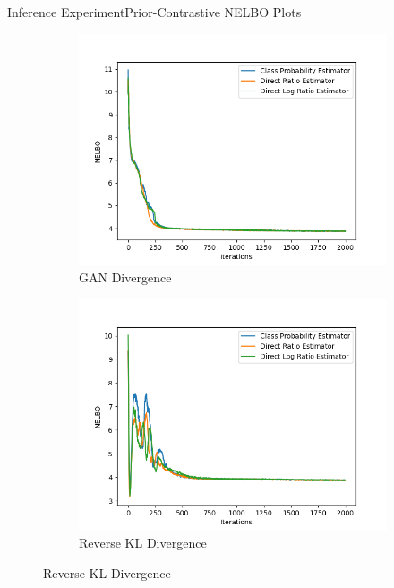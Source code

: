 \documentclass{beamer}
\begin{document}
\begin{frame}{Inference Experiment}{Prior-Contrastive NELBO Plots}
\begin{figure}
\begin{subfigure}{0.49\textwidth}
\includegraphics[width=\linewidth]{part2nelbos/PCADVvsPCADVexpvsPCADVgudlog.png}
\caption{GAN Divergence}
\end{subfigure}
\begin{subfigure}{0.49\textwidth}
\includegraphics[width=\linewidth]{part2nelbos/PCKLDvsPCKLexpvsPCKLgudlog.png}
\caption{Reverse KL Divergence}
\end{subfigure}
\end{figure}
\end{frame}
\end{document}
